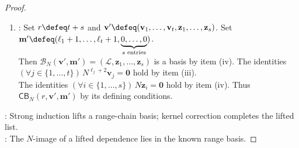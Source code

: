 \begin{theorem}
\begin{proof}
\begin{enumerate}[label=(\roman*)]
Choose $\mathbf{w}_1,\ldots,\mathbf{w}_s$ such that $(\mathcal{L},\mathbf{w}_1,\ldots,\mathbf{w}_s)$ is a basis by Theorem \ref{thm:extending-independent-lists}.\\
Choose $(\mathbf{x}_i)_{i=1}^{s}\in\operatorname{span}(\mathcal{L})^s$ satisfying $(\forall i\in\{1,\ldots,s\})\,N\mathbf{x}_i=N\mathbf{w}_i$ by $\mathcal{W}=N(\operatorname{span}(\mathcal{L}))$.\\
Set $\mathbf{z}_i\defeq\mathbf{w}_i-\mathbf{x}_i$ for $i\in\{1,\ldots,s\}$. Then $(\forall i\in\{1,\ldots,s\})\,N\mathbf{z}_i=\mathbf{0}$ by construction.\\
The list $(\mathcal{L},\mathbf{z}_1,\ldots,\mathbf{z}_s)$ spans $\mathcal{V}$ by $\mathbf{w}_i=\mathbf{z}_i+\mathbf{x}_i$ and $\mathbf{x}_i\in\operatorname{span}(\mathcal{L})$. Suppose a linear combination of $(\mathcal{L},\mathbf{z}_1,\ldots,\mathbf{z}_s)$ is zero.\\
Substitute $\mathbf{z}_i=\mathbf{w}_i-\mathbf{x}_i$ in this relation. Every $\mathbf{w}_i$-coefficient is zero by linear independence of $(\mathcal{L},\mathbf{w}_1,\ldots,\mathbf{w}_s)$.\\
The remaining $\mathcal{L}$-coefficients are zero by linear independence of $\mathcal{L}$.\\
Thus $(\mathcal{L},\mathbf{z}_1,\ldots,\mathbf{z}_s)$ is linearly independent, hence a basis by the preceding spanning property.
\item {}: Set $r\defeq t+s$ and $\mathbf{v}'\defeq(\mathbf{v}_1,\ldots,\mathbf{v}_t,\mathbf{z}_1,\ldots,\mathbf{z}_s)$. Set $\mathbf{m}'\defeq(\ell_1+1,\ldots,\ell_t+1,\underbrace{0,\ldots,0}_{s\text{ entries}})$.\\
Then $\mathcal{B}_N(\mathbf{v}',\mathbf{m}')=(\mathcal{L},\mathbf{z}_1,\ldots,\mathbf{z}_s)$ is a basis by item (iv). The identities $(\forall j\in\{1,\ldots,t\})\,N^{\ell_j+2}\mathbf{v}_j=\mathbf{0}$ hold by item (iii).\\
The identities $(\forall i\in\{1,\ldots,s\})\,N\mathbf{z}_i=\mathbf{0}$ hold by item (iv). Thus $\mathsf{CB}_N(r,\mathbf{v}',\mathbf{m}')$ by its defining conditions.
\end{enumerate}
: Strong induction lifts a range-chain basis; kernel correction completes the lifted list.\\
: The $N$-image of a lifted dependence lies in the known range basis.
\end{proof}
\end{theorem}

